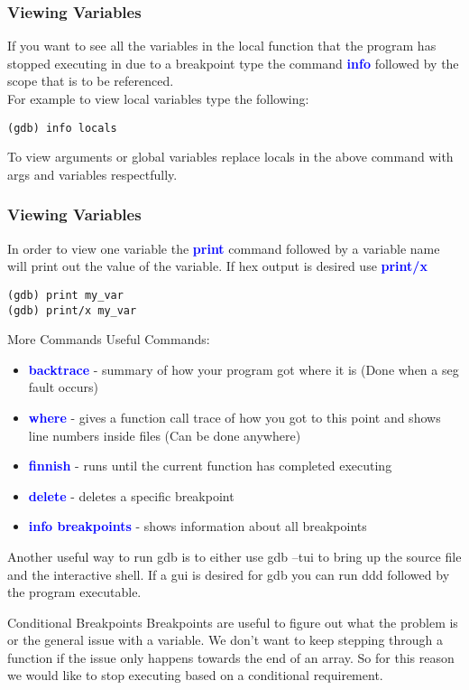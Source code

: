 \documentclass[11pt]{beamer}
\begin{document}
\begin{frame}[fragile]
\frametitle{Viewing Variables}
If you want to see all the variables in the local function that the program has stopped executing in due to a breakpoint type the command \textbf{\textcolor{blue}{info}} followed by the scope that is to be referenced. \\
For example to view local variables type the following:
\begin{lstlisting}[style=BashInputStyle]
(gdb) info locals
\end{lstlisting}
To view arguments or global variables replace locals in the above command with args and variables respectfully.
\end{frame}

\begin{frame}[fragile]
\frametitle{Viewing Variables}
In order to view one variable the \textbf{\textcolor{blue}{print}} command followed by a variable name will print out the value of the variable. If hex output is desired use \textbf{\textcolor{blue}{print/x}}
\begin{lstlisting}[style=BashInputStyle]
(gdb) print my_var
(gdb) print/x my_var
\end{lstlisting}
\end{frame}

\begin{frame}{More Commands}
Useful Commands:
\begin{itemize}
\item \textbf{\textcolor{blue}{backtrace}} - summary of how your program got where it is (Done when a seg fault occurs)
\item \textbf{\textcolor{blue}{where}} - gives a function call trace of how you got to this point and shows line numbers inside files (Can be done anywhere)
\item \textbf{\textcolor{blue}{finnish}} - runs until the current function has completed executing
\item \textbf{\textcolor{blue}{delete}} - deletes a specific breakpoint
\item \textbf{\textcolor{blue}{info breakpoints}} - shows information about all breakpoints
\end{itemize}
Another useful way to run gdb is to either use gdb --tui to bring up the source file and the interactive shell. If a gui is desired for gdb you can run ddd followed by the program executable. 
\end{frame}


\begin{frame}{Conditional Breakpoints}
Breakpoints are useful to figure out what the problem is or the general issue with a variable. 
\break
\break
We don't want to keep stepping through a function if the issue only happens towards the end of an array. 
\break
\break
So for this reason we would like to stop executing based on a conditional requirement.
\end{frame}
\end{document}
